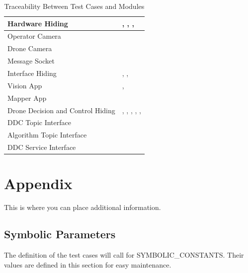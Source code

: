\documentclass[12pt, titlepage]{article}
\begin{document}
\begin{table}[!h]
\begin{center}
\caption {Traceability Between Test Cases and Modules}
\label{tab:traceTC_Module}
\begin{tabular}{ | m{5cm} | m{10cm} | }
\hline
Hardware Hiding & \nameref{tab:UTC_001}, \nameref{tab:UTC_002}, \nameref{tab:UTC_003}, \nameref{tab:UTC_004} \\
\hline
Operator Camera & \nameref{tab:UTC_005}\\
\hline
Drone Camera &  \nameref{tab:UTC_006}\\
\hline
Message Socket &  \nameref{tab:UTC_007}\\
\hline
Interface Hiding &  \nameref{tab:UTC_008}, \nameref{tab:UTC_009}, \nameref{tab:UTC_010}\\
\hline
Vision App &  \nameref{tab:UTC_011}, \nameref{tab:UTC_012}\\
\hline
Mapper App &  \nameref{tab:UTC_013}\\
\hline
Drone Decision and Control Hiding &  \nameref{tab:UTC_014}, \nameref{tab:UTC_015}, \nameref{tab:UTC_016}, \nameref{tab:UTC_017}, \nameref{tab:UTC_018}, \nameref{tab:UTC_019} \\
\hline
DDC Topic Interface &  \nameref{tab:UTC_020}\\
\hline
Algorithm Topic Interface &  \nameref{tab:UTC_021}\\
\hline
DDC Service Interface &  \nameref{tab:UTC_022}\\
\hline
\end{tabular}
\end{center}
\end{table}				




\newpage

\section{Appendix}

This is where you can place additional information.

\subsection{Symbolic Parameters}

The definition of the test cases will call for SYMBOLIC\_CONSTANTS.
Their values are defined in this section for easy maintenance.
\end{document}

